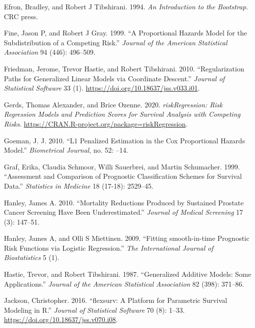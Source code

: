 \begin{CSLReferences}{1}{0}
\leavevmode{}%
Efron, Bradley, and Robert J Tibshirani. 1994. \emph{An Introduction to the Bootstrap}. CRC press.

\leavevmode{}%
Fine, Jason P, and Robert J Gray. 1999. {``A Proportional Hazards Model for the Subdistribution of a Competing Risk.''} \emph{Journal of the American Statistical Association} 94 (446): 496--509.

\leavevmode{}%
Friedman, Jerome, Trevor Hastie, and Robert Tibshirani. 2010. {``Regularization Paths for Generalized Linear Models via Coordinate Descent.''} \emph{Journal of Statistical Software} 33 (1). \url{https://doi.org/10.18637/jss.v033.i01}.

\leavevmode{}%
Gerds, Thomas Alexander, and Brice Ozenne. 2020. \emph{riskRegression: Risk Regression Models and Prediction Scores for Survival Analysis with Competing Risks}. \url{https://CRAN.R-project.org/package=riskRegression}.

\leavevmode{}%
Goeman, J. J. 2010. {``L1 Penalized Estimation in the Cox Proportional Hazards Model.''} \emph{Biometrical Journal}, no. 52: --14.

\leavevmode{}%
Graf, Erika, Claudia Schmoor, Willi Sauerbrei, and Martin Schumacher. 1999. {``Assessment and Comparison of Prognostic Classification Schemes for Survival Data.''} \emph{Statistics in Medicine} 18 (17-18): 2529--45.

\leavevmode{}%
Hanley, James A. 2010. {``Mortality Reductions Produced by Sustained Prostate Cancer Screening Have Been Underestimated.''} \emph{Journal of Medical Screening} 17 (3): 147--51.

\leavevmode{}%
Hanley, James A, and Olli S Miettinen. 2009. {``Fitting {smooth-in-time} Prognostic Risk Functions via Logistic Regression.''} \emph{The International Journal of Biostatistics} 5 (1).

\leavevmode{}%
Hastie, Trevor, and Robert Tibshirani. 1987. {``Generalized Additive Models: Some Applications.''} \emph{Journal of the American Statistical Association} 82 (398): 371--86.

\leavevmode{}%
Jackson, Christopher. 2016. {``{flexsurv}: A Platform for Parametric Survival Modeling in {R}.''} \emph{Journal of Statistical Software} 70 (8): 1--33. \url{https://doi.org/10.18637/jss.v070.i08}.


\end{CSLReferences}
